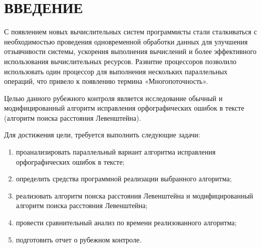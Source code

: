 \chapter*{\hfill{\centering ВВЕДЕНИЕ}\hfill}

С появлением новых вычислительных систем программисты стали сталкиваться с необходимостью проведения одновременной обработки данных для улучшения отзывчивости системы, ускорения выполнения вычислений и более эффективного использования вычислительных ресурсов.
Развитие процессоров позволило использовать один процессор для выполнения нескольких параллельных операций, что привело к появлению термина «Многопоточность».

Целью данного рубежного контроля является исследование обычный и модифицированный алгоритм исправления орфографических ошибок в тексте (алгоритм поиска расстояния Левенштейна).

Для достижения цели, требуется выполнить следующие задачи:

\begin{enumerate}[label={\arabic*)}]
	\item проанализировать параллельный вариант алгоритма исправления орфографических ошибок в тексте;
	\item определить средства программной реализации выбранного алгоритма;
	\item реализовать алгоритм поиска расстояния Левенштейна и модифицированный алгоритм поиска расстояния Левенштейна;
	\item провести сравнительный анализ по времени реализованного алгоритма;
	\item подготовить отчет о рубежном контроле.
\end{enumerate}